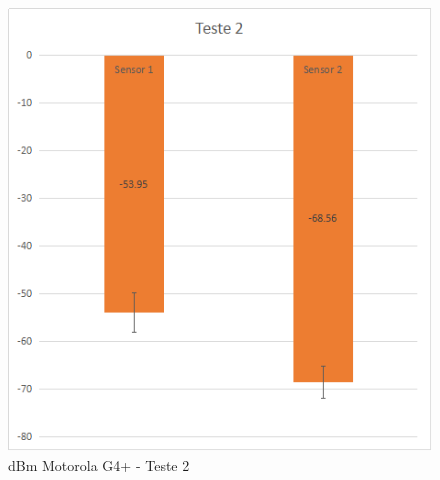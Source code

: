 \begin{figure}[htb]
	\caption{\label{fig:modulos-esp}dBm Motorola G4+ - Teste 2}
	\begin{center}
		\includegraphics[width=1\textwidth]{060-testes/data-analisis/distance-mg4plus-netflix/target-Teste2.png}
	\end{center}
\end{figure}

